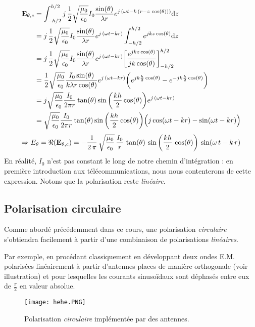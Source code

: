 \begin{align*}
\bold{E}_{\theta,c}&=\int_{-h/2}^{h/2}j\,\frac{1}{2}\sqrt{\frac{\mu_0}{\epsilon_0}}I_0 \frac{\sin(\theta)}{\lambda r}e^{j\,(\omega t-k\,(r-z\,\cos(\theta)))} \mathrm{d}z \\
&=j\,\frac{1}{2}\sqrt{\frac{\mu_0}{\epsilon_0}}I_0\frac{\sin(\theta)}{\lambda r}e^{j\,(\omega t-kr)} \int_{-h/2}^{h/2}e^{jkz\cos(\theta)} \mathrm{d}z \\
&=j\,\frac{1}{2}\sqrt{\frac{\mu_0}{\epsilon_0}}I_0\frac{\sin(\theta)}{\lambda r}e^{j\,(\omega t-kr)} \bigg[\frac{e^{jkz\cos(\theta)}}{jk\cos(\theta)}  \bigg]_{-h/2}^{h/2}\\
&=\frac{1}{2}\sqrt{\frac{\mu_0}{\epsilon_0}}\frac{I_0\sin(\theta)}{k\lambda r\cos(\theta)}e^{j\,(\omega t-kr)} \bigg(e^{jk\frac{h}{2}\cos(\theta)}-e^{-jk\frac{h}{2}\cos(\theta)}\bigg)\\
&=j\sqrt{\frac{\mu_0}{\epsilon_0}}\frac{I_0}{2\pi r}\tan(\theta)\sin\bigg(\frac{kh}{2}\cos(\theta)\bigg) e^{j\,(\omega t-kr)}\\
&=\sqrt{\frac{\mu_0}{\epsilon_0}}\frac{I_0}{2\pi r}\tan(\theta)\sin\bigg(\frac{kh}{2}\cos(\theta)\bigg) \Big(j\cos(\omega t-kr)-\sin(\omega t-kr)\Big)
\end{align*}
\[ \Rightarrow E_{\theta} = \Re(\bold{E}_{\theta,c})= -\frac{1}{2\,\pi}\,\sqrt{\frac{\mu_0}{\epsilon_0}}\,\frac{I_0}{r}\,\tan(\theta)\, \sin\bigg(\frac{kh}{2}\,\cos(\theta)\bigg)\,\sin(\omega\,t-k\,r)   \]
En réalité, $I_0$ n'est pas constant le long de notre chemin d'intégration : en première introduction aux télécommunications, nous nous contenterons de cette expression. Notons que la polarisation reste \textit{linéaire}. 


\subsection{Polarisation circulaire}
Comme abordé précédemment dans ce cours, une polarisation \textit{circulaire} s'obtiendra facilement à partir d'une combinaison de polarisations \textit{linéaires}.

Par exemple, en procédant classiquement en développant deux ondes E.M. polarisées linéairement à partir d'antennes places de manière orthogonale (voir illustration) et pour lesquelles les courants sinusoïdaux sont déphasés entre eux de $\frac{\pi}{2}$ en valeur absolue. 

\begin{figure}[h]\centering
\texttt{[image: hehe.PNG]}
\caption{Polarisation \textit{circulaire} implémentée par des antennes.}
\label{fig:circ}
\end{figure}

